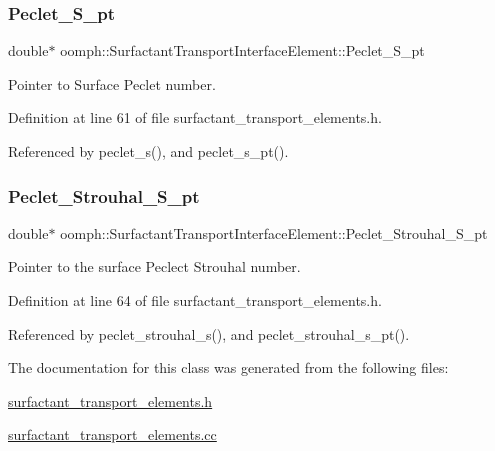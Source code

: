 \subsubsection{\texorpdfstring{Peclet\+\_\+\+S\+\_\+pt}{Peclet\_S\_pt}}
{\footnotesize\ttfamily double$\ast$ oomph\+::\+Surfactant\+Transport\+Interface\+Element\+::\+Peclet\+\_\+\+S\+\_\+pt\hspace{0.3cm}{\ttfamily [private]}}



Pointer to Surface Peclet number. 



Definition at line 61 of file surfactant\+\_\+transport\+\_\+elements.\+h.



Referenced by peclet\+\_\+s(), and peclet\+\_\+s\+\_\+pt().

\mbox{\label{classoomph_1_1SurfactantTransportInterfaceElement_a3c4a6abcb3795ee53baff49864cd0020}} 
\subsubsection{\texorpdfstring{Peclet\+\_\+\+Strouhal\+\_\+\+S\+\_\+pt}{Peclet\_Strouhal\_S\_pt}}
{\footnotesize\ttfamily double$\ast$ oomph\+::\+Surfactant\+Transport\+Interface\+Element\+::\+Peclet\+\_\+\+Strouhal\+\_\+\+S\+\_\+pt\hspace{0.3cm}{\ttfamily [private]}}



Pointer to the surface Peclect Strouhal number. 



Definition at line 64 of file surfactant\+\_\+transport\+\_\+elements.\+h.



Referenced by peclet\+\_\+strouhal\+\_\+s(), and peclet\+\_\+strouhal\+\_\+s\+\_\+pt().



The documentation for this class was generated from the following files\+:\begin{DoxyCompactItemize}
\item 
\hyperlink{surfactant__transport__elements_8h}{surfactant\+\_\+transport\+\_\+elements.\+h}\item 
\hyperlink{surfactant__transport__elements_8cc}{surfactant\+\_\+transport\+\_\+elements.\+cc}\end{DoxyCompactItemize}
